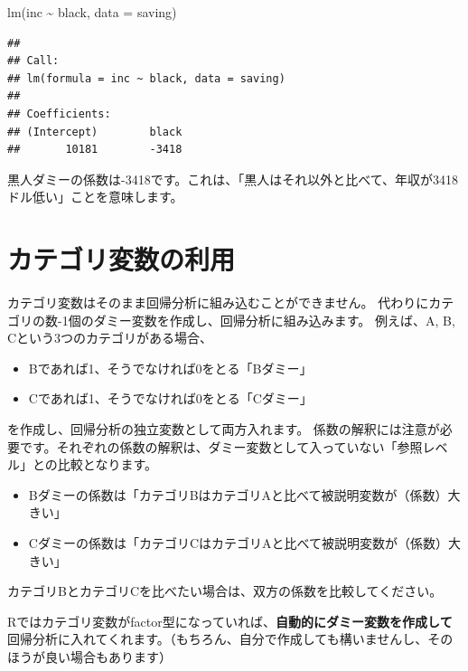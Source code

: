 \documentclass[
]{book}
\newenvironment{Shaded}{\begin{snugshade}}{\end{snugshade}}
\newcommand{\AttributeTok}[1]{\textcolor[rgb]{0.77,0.63,0.00}{#1}}
\newcommand{\FunctionTok}[1]{\textcolor[rgb]{0.00,0.00,0.00}{#1}}
\newcommand{\NormalTok}[1]{#1}
\newcommand{\SpecialCharTok}[1]{\textcolor[rgb]{0.00,0.00,0.00}{#1}}
\providecommand{\tightlist}{%
  \setlength{\itemsep}{0pt}\setlength{\parskip}{0pt}}
\begin{document}
\begin{Shaded}
\begin{Highlighting}[]
\FunctionTok{lm}\NormalTok{(inc }\SpecialCharTok{\textasciitilde{}}\NormalTok{ black, }\AttributeTok{data =}\NormalTok{ saving)}
\end{Highlighting}
\end{Shaded}

\begin{verbatim}
## 
## Call:
## lm(formula = inc ~ black, data = saving)
## 
## Coefficients:
## (Intercept)        black  
##       10181        -3418
\end{verbatim}

黒人ダミーの係数は-3418です。これは、「黒人はそれ以外と比べて、年収が3418ドル低い」ことを意味します。

\hypertarget{ux30abux30c6ux30b4ux30eaux5909ux6570ux306eux5229ux7528}{%
\section{カテゴリ変数の利用}\label{ux30abux30c6ux30b4ux30eaux5909ux6570ux306eux5229ux7528}}

カテゴリ変数はそのまま回帰分析に組み込むことができません。
代わりにカテゴリの数-1個のダミー変数を作成し、回帰分析に組み込みます。
例えば、A, B, Cという3つのカテゴリがある場合、

\begin{itemize}
\tightlist
\item
  Bであれば1、そうでなければ0をとる「Bダミー」
\item
  Cであれば1、そうでなければ0をとる「Cダミー」
\end{itemize}

を作成し、回帰分析の独立変数として両方入れます。
係数の解釈には注意が必要です。それぞれの係数の解釈は、ダミー変数として入っていない「参照レベル」との比較となります。

\begin{itemize}
\tightlist
\item
  Bダミーの係数は「カテゴリBはカテゴリAと比べて被説明変数が（係数）大きい」
\item
  Cダミーの係数は「カテゴリCはカテゴリAと比べて被説明変数が（係数）大きい」
\end{itemize}

カテゴリBとカテゴリCを比べたい場合は、双方の係数を比較してください。

Rではカテゴリ変数がfactor型になっていれば、\textbf{自動的にダミー変数を作成して}回帰分析に入れてくれます。（もちろん、自分で作成しても構いませんし、そのほうが良い場合もあります）
\end{document}
